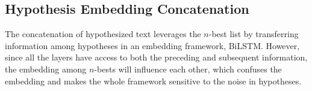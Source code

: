 

\subsection{Hypothesis Embedding Concatenation}
The concatenation of hypothesized text leverages the $n$-best list by transferring information among hypotheses in an embedding framework, BiLSTM. However, since all the layers have access to both the preceding and subsequent information, the embedding among $n$-bests will influence each other, which confuses the embedding and makes the whole framework sensitive to the noise in hypotheses.

